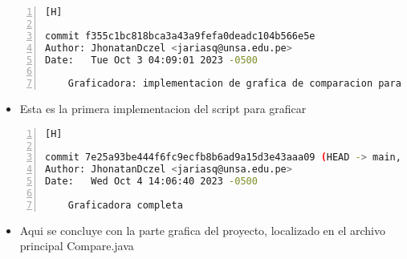 \begin{lstlisting}[language=bash, caption={Testear algoritmo}, numbers=left, firstnumber=1][H]

commit f355c1bc818bca3a43a9fefa0deadc104b566e5e
Author: JhonatanDczel <jariasq@unsa.edu.pe>
Date:   Tue Oct 3 04:09:01 2023 -0500

    Graficadora: implementacion de grafica de comparacion para dos archivos
\end{lstlisting}
\begin{itemize}
    \item Esta es la primera implementacion del script para graficar 
\end{itemize}
\begin{lstlisting}[language=bash, caption={Testear algoritmo}, numbers=left, firstnumber=1][H]

commit 7e25a93be444f6fc9ecfb8b6ad9a15d3e43aaa09 (HEAD -> main, origin/main, origin/HEAD)
Author: JhonatanDczel <jariasq@unsa.edu.pe>
Date:   Wed Oct 4 14:06:40 2023 -0500

    Graficadora completa
\end{lstlisting}
\begin{itemize}
    \item Aqui se concluye con la parte grafica del proyecto, localizado en el archivo principal Compare.java
\end{itemize}

